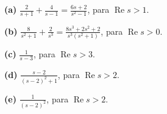 \noindent\textbf{(a)} $\frac2{s+1}+\frac4{s-1}=\frac{6s+2}{s^2-1}$, para $\operatorname{Re}s>1$.

\noindent\textbf{(b)} $\frac8{s^2+1}+\frac2{s^3}=\frac{8s^3+2s^2+2}{s^3(s^2+1)}$, para $\operatorname{Re}s>0$.

\noindent\textbf{(c)} $\frac1{s-3}$, para $\operatorname{Re}s>3$.

\noindent\textbf{(d)} $\frac{s-2}{(s-2)^2+1}$, para $\operatorname{Re}s>2$.

\noindent\textbf{(e)} $\frac1{(s-2)^2}$, para $\operatorname{Re}s>2$.
